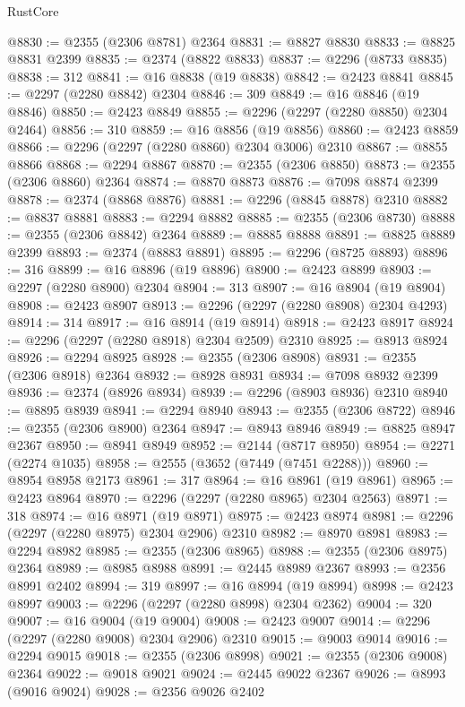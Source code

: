 \begin{lexlean}{RustCore}
\begin{coremodule}
@8830 := @2355 (@2306 @8781) @2364
@8831 := @8827 @8830
@8833 := @8825 @8831 @2399
@8835 := @2374 (@8822 @8833)
@8837 := @2296 (@8733 @8835)
@8838 := 312
@8841 := @16 @8838 (@19 @8838)
@8842 := @2423 @8841
@8845 := @2297 (@2280 @8842) @2304
@8846 := 309
@8849 := @16 @8846 (@19 @8846)
@8850 := @2423 @8849
@8855 := @2296 (@2297 (@2280 @8850) @2304 @2464)
@8856 := 310
@8859 := @16 @8856 (@19 @8856)
@8860 := @2423 @8859
@8866 := @2296 (@2297 (@2280 @8860) @2304 @3006) @2310
@8867 := @8855 @8866
@8868 := @2294 @8867
@8870 := @2355 (@2306 @8850)
@8873 := @2355 (@2306 @8860) @2364
@8874 := @8870 @8873
@8876 := @7098 @8874 @2399
@8878 := @2374 (@8868 @8876)
@8881 := @2296 (@8845 @8878) @2310
@8882 := @8837 @8881
@8883 := @2294 @8882
@8885 := @2355 (@2306 @8730)
@8888 := @2355 (@2306 @8842) @2364
@8889 := @8885 @8888
@8891 := @8825 @8889 @2399
@8893 := @2374 (@8883 @8891)
@8895 := @2296 (@8725 @8893)
@8896 := 316
@8899 := @16 @8896 (@19 @8896)
@8900 := @2423 @8899
@8903 := @2297 (@2280 @8900) @2304
@8904 := 313
@8907 := @16 @8904 (@19 @8904)
@8908 := @2423 @8907
@8913 := @2296 (@2297 (@2280 @8908) @2304 @4293)
@8914 := 314
@8917 := @16 @8914 (@19 @8914)
@8918 := @2423 @8917
@8924 := @2296 (@2297 (@2280 @8918) @2304 @2509) @2310
@8925 := @8913 @8924
@8926 := @2294 @8925
@8928 := @2355 (@2306 @8908)
@8931 := @2355 (@2306 @8918) @2364
@8932 := @8928 @8931
@8934 := @7098 @8932 @2399
@8936 := @2374 (@8926 @8934)
@8939 := @2296 (@8903 @8936) @2310
@8940 := @8895 @8939
@8941 := @2294 @8940
@8943 := @2355 (@2306 @8722)
@8946 := @2355 (@2306 @8900) @2364
@8947 := @8943 @8946
@8949 := @8825 @8947 @2367
@8950 := @8941 @8949
@8952 := @2144 (@8717 @8950)
@8954 := @2271 (@2274 @1035)
@8958 := @2555 (@3652 (@7449 (@7451 @2288)))
@8960 := @8954 @8958 @2173
@8961 := 317
@8964 := @16 @8961 (@19 @8961)
@8965 := @2423 @8964
@8970 := @2296 (@2297 (@2280 @8965) @2304 @2563)
@8971 := 318
@8974 := @16 @8971 (@19 @8971)
@8975 := @2423 @8974
@8981 := @2296 (@2297 (@2280 @8975) @2304 @2906) @2310
@8982 := @8970 @8981
@8983 := @2294 @8982
@8985 := @2355 (@2306 @8965)
@8988 := @2355 (@2306 @8975) @2364
@8989 := @8985 @8988
@8991 := @2445 @8989 @2367
@8993 := @2356 @8991 @2402
@8994 := 319
@8997 := @16 @8994 (@19 @8994)
@8998 := @2423 @8997
@9003 := @2296 (@2297 (@2280 @8998) @2304 @2362)
@9004 := 320
@9007 := @16 @9004 (@19 @9004)
@9008 := @2423 @9007
@9014 := @2296 (@2297 (@2280 @9008) @2304 @2906) @2310
@9015 := @9003 @9014
@9016 := @2294 @9015
@9018 := @2355 (@2306 @8998)
@9021 := @2355 (@2306 @9008) @2364
@9022 := @9018 @9021
@9024 := @2445 @9022 @2367
@9026 := @8993 (@9016 @9024)
@9028 := @2356 @9026 @2402

\end{coremodule}
\end{lexlean}
